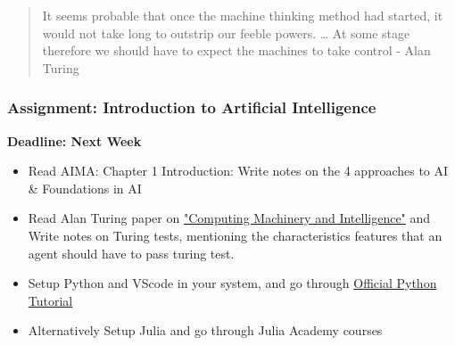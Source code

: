 \documentclass{beamer}
\begin{document}
\begin{frame}
  \begin{quote}
    It seems probable that once the machine thinking method had started, it would not take long to outstrip our feeble powers. … At some stage therefore we should have to expect the machines to take control - Alan Turing
  \end{quote}
  
\end{frame}

\begin{frame}
  \frametitle{Assignment: Introduction to Artificial Intelligence}
  \textbf{Deadline: Next Week}

  \begin{itemize}
    \item Read AIMA: Chapter 1 Introduction: Write notes on the 4 approaches to AI \& Foundations in AI
    \item Read Alan Turing paper on \href{https://redirect.cs.umbc.edu/courses/471/papers/turing.pdf}{"Computing Machinery and Intelligence"} and Write notes on Turing tests, mentioning the characteristics features that an agent should have to pass turing test.
    \item Setup Python and VScode in your system, and go through \href{https://docs.python.org/3/tutorial/index.html}{Official Python Tutorial}
    \item Alternatively Setup Julia and go through Julia Academy courses
  \end{itemize}
\end{frame}
\end{document}

